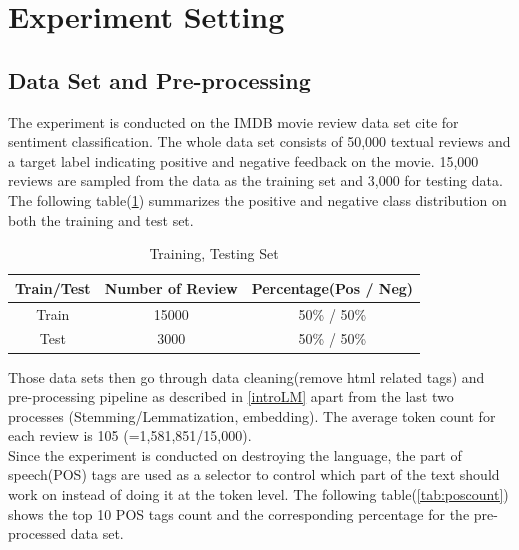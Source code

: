 \documentclass[12pt]{article}
\begin{document}
\section{Experiment Setting} 

\subsection{Data Set and Pre-processing}
The experiment is conducted on the IMDB movie review data set {cite} for sentiment classification. The whole data set consists of 50,000 textual reviews and a target label indicating  positive and negative feedback on the movie. 15,000 reviews are sampled from the data as the training set and 3,000 for testing data. The following table(\ref{tab:dataset}) summarizes the positive and negative class distribution on both the training and test set.
\begin{table}[!h]
    \centering
        \begin{tabular}{||c|c| c||} 
        \hline
 Train/Test & Number of Review & Percentage(Pos / Neg) \\ 
 \hline\hline
 Train  &  15000  & 50\% / 50\% \\ 
 \hline
  Test & 3000  & 50\% / 50\%  \\ 
 \hline
    \end{tabular}
     \caption{Training, Testing Set}
    \label{tab:dataset}
\end{table} 

Those data sets then go through data cleaning(remove html related tags) and pre-processing pipeline as described in \ref{introLM} apart from the last two processes (Stemming/Lemmatization, embedding). The average token count for each review is 105 (=1,581,851/15,000). \\

Since the experiment is conducted on destroying the language, the part of speech(POS) tags are used as a selector to control which part of the text should work on instead of doing it at the token level. The following table(\ref{tab:poscount}) shows the top 10 POS tags count and the corresponding percentage  for the pre-processed data set.
\end{document}
